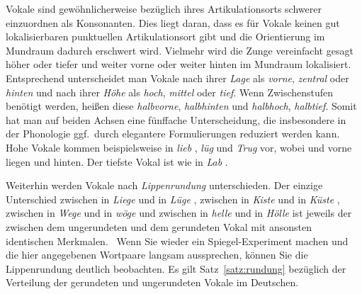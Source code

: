 Vokale sind gewöhnlicherweise bezüglich ihres Artikulationsorts schwerer einzuordnen als Konsonanten.
Dies liegt daran, dass es für Vokale keinen gut lokalisierbaren punktuellen Artikulationsort gibt und die Orientierung im Mundraum dadurch erschwert wird.
Vielmehr wird die Zunge vereinfacht gesagt höher oder tiefer und weiter vorne oder weiter hinten im Mundraum lokalisiert.
Entsprechend unterscheidet man Vokale nach ihrer \textit{Lage} als \textit{vorne}, \textit{zentral} oder \textit{hinten} und nach ihrer \textit{Höhe} als \textit{hoch}, \textit{mittel} oder \textit{tief}.
Wenn Zwischenstufen benötigt werden, heißen diese \textit{halbvorne}, \textit{halbhinten} und \textit{halbhoch}, \textit{halbtief}.
Somit hat man auf beiden Achsen eine fünffache Unterscheidung, die insbesondere in der Phonologie ggf.\ durch elegantere Formulierungen reduziert werden kann.
Hohe Vokale kommen beispielsweise in \textit{lieb} \textipa{[li:p]}, \textit{lüg} \textipa{[ly:k]} und \textit{Trug} \textipa{[tKu:k]} vor, wobei \textipa{[i]} und \textipa{[y]} vorne liegen und \textipa{[u]} hinten.
Der tiefste Vokal ist \textipa{[a]} wie in \textit{Lab} \textipa{[la:p]}.

Weiterhin werden Vokale nach \textit{Lippenrundung} unterschieden.
Der einzige Unterschied
zwischen \textipa{[i]} in \textit{Liege} \textipa{[li:g@]} und \textipa{[y]} in \textit{Lüge} \textipa{[ly:g@]},
zwischen \textipa{[I]} in \textit{Kiste} \textipa{[kIst@]} und \textipa{[Y]} in \textit{Küste} \textipa{[kYst@]},
zwischen \textipa{[e]} in \textit{Wege} \textipa{[ve:g@]} und \textipa{[\o]} in \textit{wöge} \textipa{[v\o:g@]}
und zwischen \textipa{[E]} in \textit{helle} \textipa{[hEl@]} und \textipa{[\oe]} in \textit{Hölle} \textipa{[h{\oe}l@]}
ist jeweils der zwischen dem ungerundeten und dem gerundeten Vokal mit ansonsten identischen Merkmalen.
\TuBegin~Wenn Sie wieder ein Spiegel-Experiment machen und die hier angegebenen Wortpaare langsam aussprechen, können Sie die Lippenrundung deutlich beobachten.
Es gilt Satz~\ref{satz:rundung} bezüglich der Verteilung der gerundeten und ungerundeten Vokale im Deutschen.


